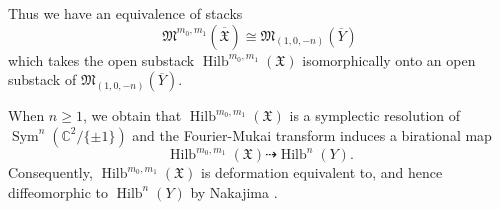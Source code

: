 \documentclass{amsart}
\theoremstyle{definition}
\newcommand{\CC} {{\mathbb C}}          %
\newcommand{\X}{\mathfrak{X}}
\newcommand{\Xbar}{\overline{\mathfrak{X}}}
\newcommand{\Ybar}{\overline{Y}}
\newcommand{\M}{\mathfrak{M}}
\newcommand{\Sym}{\operatorname{Sym}}
\newcommand{\Hilb}{\operatorname{Hilb}}
\newcommand{\adam}{\color{blue}}
\begin{document}
Thus we have an equivalence of stacks
\[
\M^{m_{0},m_{1}}(\Xbar ) \cong \M_{(1,0,-n)}(\Ybar )
\]
which takes the open substack $\Hilb^{m_{0},m_{1}}(\X )$ isomorphically
onto an open substack of $\M_{(1,0,-n)} (\Ybar )$. 
{\adam
When $n \geq 1$, we obtain that $\Hilb^{m_{0},m_{1}}(\X )$ is a symplectic resolution of $\Sym^{n} (\CC^{2}/\{\pm 1
\})$ and the Fourier-Mukai transform induces a birational map
\[
\Hilb^{m_{0},m_{1}}(\X ) \dashrightarrow \Hilb^{n}(Y).
\]
Consequently, $\Hilb^{m_{0},m_{1}}(\X )$ is deformation
equivalent to, and hence diffeomorphic to $\Hilb^{n}(Y)$ by Nakajima \cite[Cor~4.2]{Nakajima1994Duke}.
%

}
\end{document}

